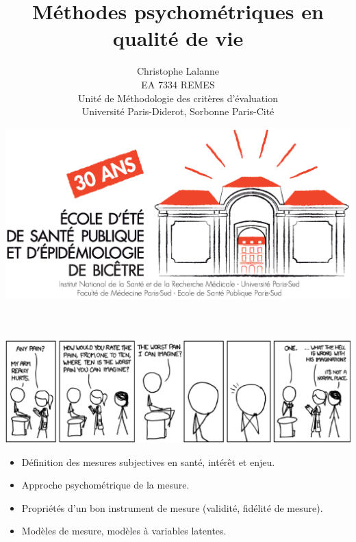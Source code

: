

\title{Méthodes psychométriques en qualité de vie}
\author{Christophe Lalanne\\EA 7334 REMES\\ Unité de Méthodologie des critères d’évaluation\\Université Paris-Diderot, Sorbonne Paris-Cité\\}
\date{\includegraphics[height=18ex]{logo.eps}}




\LogoOff
\maketitle
\rightfooter{\quad\textsf{\thepage}}


\foilhead{}

\bigskip
{\centering \includegraphics[width=\textwidth]{figs/pain.eps}\par}


\begin{itemize}
\item Définition des mesures subjectives en santé, intérêt et enjeu.
\item Approche psychométrique de la mesure.
\item Propriétés d'un bon instrument de mesure (validité, fidélité de mesure).
\item Modèles de mesure, modèles à variables latentes.
\end{itemize}



